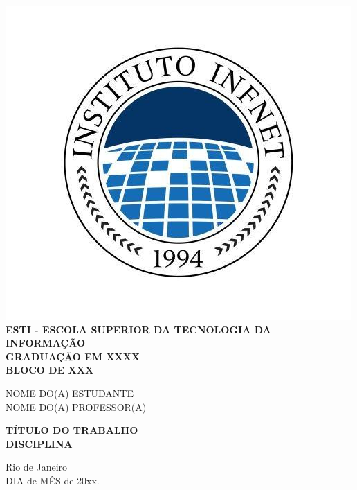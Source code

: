 \documentclass[a4paper, 12pt]{article} %
\begin{document}
\begin{center}

  \includegraphics[scale=1]{logo-infnet.png}\\
  \large
  \textbf{ESTI - ESCOLA SUPERIOR DA TECNOLOGIA DA INFORMAÇÃO}\\
  \textbf{GRADUAÇÃO EM XXXX}\\
  \textbf{BLOCO DE XXX}
  
  \vspace{6.5cm}
  NOME DO(A) ESTUDANTE \\
  NOME DO(A) PROFESSOR(A)

  \vspace{4.5cm}
  \textbf{TÍTULO DO TRABALHO}\\
  \textbf{DISCIPLINA}

  \vspace{3cm}
  Rio de Janeiro \\
  DIA de MÊS de 20xx.

\end{center}
\newpage

\onehalfspacing
\end{document}
